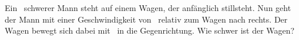 Ein \mMaO\ schwerer Mann steht auf einem Wagen, der anfänglich stillsteht. Nun geht der Mann mit einer Geschwindigkeit von \uReO\ relativ zum Wagen nach rechts. Der Wagen bewegt sich dabei mit \vWaO\ in die Gegenrichtung. Wie schwer ist der Wagen?
